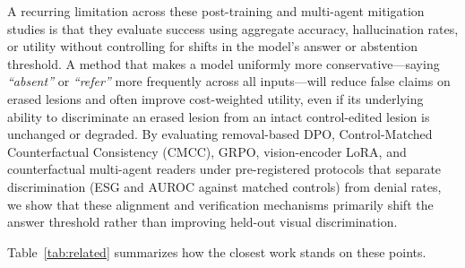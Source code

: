 \documentclass[5p,times,twocolumn,authoryear]{elsarticle}
\begin{document}
A recurring limitation across these post-training and multi-agent mitigation studies is that they evaluate success using aggregate accuracy, hallucination rates, or utility without controlling for shifts in the model's answer or abstention threshold. A method that makes a model uniformly more conservative---saying \emph{``absent''} or \emph{``refer''} more frequently across all inputs---will reduce false claims on erased lesions and often improve cost-weighted utility, even if its underlying ability to discriminate an erased lesion from an intact control-edited lesion is unchanged or degraded. By evaluating removal-based DPO, Control-Matched Counterfactual Consistency (CMCC), GRPO, vision-encoder LoRA, and counterfactual multi-agent readers under pre-registered protocols that separate discrimination (ESG and AUROC against matched controls) from denial rates, we show that these alignment and verification mechanisms primarily shift the answer threshold rather than improving held-out visual discrimination.

Table~\ref{tab:related} summarizes how the closest work stands on these points.
\end{document}
